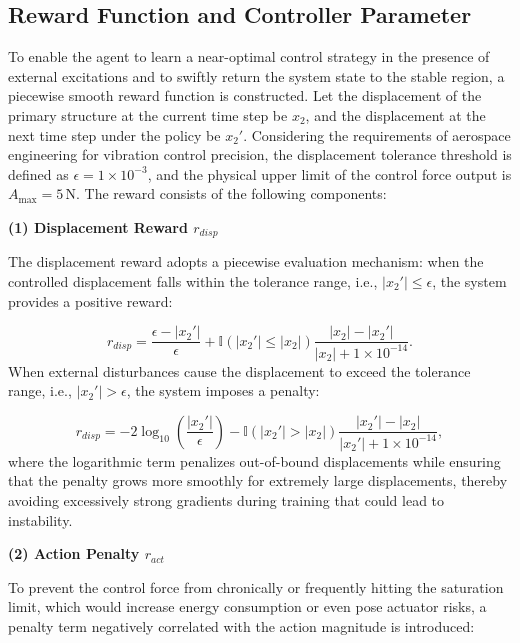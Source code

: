 \documentclass[review]{elsarticle}
\begin{document}
\subsection{Reward Function and Controller Parameter}

To enable the agent to learn a near-optimal control strategy in the presence of external excitations and to swiftly return the system state to the stable region, a piecewise smooth reward function is constructed. Let the displacement of the primary structure at the current time step be $x_2$, and the displacement at the next time step under the policy be $x_2'$. Considering the requirements of aerospace engineering for vibration control precision, the displacement tolerance threshold is defined as $\epsilon = 1 \times 10^{-3}$, and the physical upper limit of the control force output is $A_{\max}=5\,\text{N}$. The reward consists of the following components:

\medskip\noindent\textbf{(1) Displacement Reward $r_{disp}$}

The displacement reward adopts a piecewise evaluation mechanism: when the controlled displacement falls within the tolerance range, i.e., $|x_2'| \le \epsilon$, the system provides a positive reward:

\begin{equation}\label{eq:reward_disp_pos}
r_{disp} = \frac{\epsilon - |x_2'|}{\epsilon} + \mathbb{I}(|x_2'| \le |x_2|) \frac{|x_2| - |x_2'|}{|x_2| + 1 \times 10^{-14}}.
\end{equation}
When external disturbances cause the displacement to exceed the tolerance range, i.e., $|x_2'| > \epsilon$, the system imposes a penalty:

\begin{equation}\label{eq:reward_disp_neg}
r_{disp} = -2 \log_{10} \left( \frac{|x_2'|}{\epsilon} \right) - \mathbb{I}(|x_2'| > |x_2|) \frac{|x_2'| - |x_2|}{|x_2'| + 1 \times 10^{-14}},
\end{equation}
where the logarithmic term penalizes out-of-bound displacements while ensuring that the penalty grows more smoothly for extremely large displacements, thereby avoiding excessively strong gradients during training that could lead to instability.

\medskip\noindent\textbf{(2) Action Penalty $r_{act}$}

To prevent the control force from chronically or frequently hitting the saturation limit, which would increase energy consumption or even pose actuator risks, a penalty term negatively correlated with the action magnitude is introduced:
\end{document}
